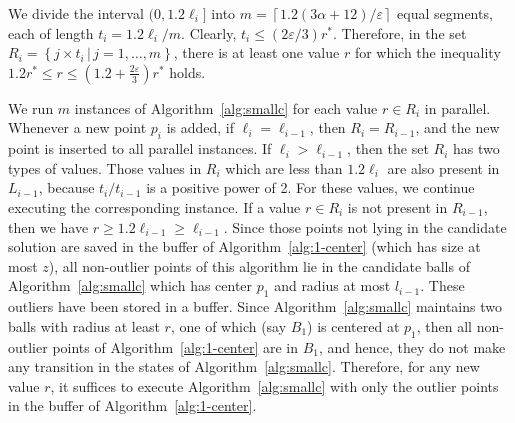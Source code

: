 \documentclass[envcountsame]{cls/cccg15}
\renewcommand{\O}{\ensuremath{{O}}}
\newcommand{\set}[1]{\left\{ #1 \right\}}
\newcommand{\ceil}[1]{\left\lceil{#1}\right\rceil}
\newcommand{\provided}{\,|\,}
\newcommand{\lee}{\leqslant}
\newcommand{\gee}{\geqslant}
\renewcommand{\le}{\lee}
\renewcommand{\ge}{\gee}
\newcommand{\eps}{\varepsilon}
\begin{document}
We divide the interval $(0, 1.2 \ell_i]$ 
into $m=\ceil{{1.2 (3 \alpha+12)}/{\eps}}$ equal segments,
each of length $t_i = 1.2 \ell_i / m$.
Clearly,  $t_i \le (2\eps/3) r^*$.
Therefore, in the set
$R_i = \set{j \times t_i \provided j = 1, \dots, m}$,
there is at least one value $r$ for which the  
inequality $1.2 r^* \le r \le (1.2 + \frac{2\eps}{3})r^*$ holds.


We run $m$ instances of Algorithm~\ref{alg:smallc} for each value $r \in R_i$ in parallel. 
Whenever a new point $p_i$ is added, 
if $\ell_i=\ell_{i-1}$, then $R_i = R_{i-1}$,
and the new point is inserted to all parallel instances. %
If $\ell_i > \ell_{i-1}$, then the set $R_i$ has two types of values.
Those values in $R_i$ which are less than $1.2\ell_i$ are also present in $L_{i-1}$,
because $t_i / t_{i-1}$ is a positive power of 2.
For these values, we continue executing the corresponding instance.
If a value $r \in R_i$ is not present in $R_{i-1}$, 
then we have $r \ge 1.2 \ell_{i - 1} \ge \ell_{i-1}$.
Since those points not lying in the candidate solution 
are saved in the buffer of Algorithm~\ref{alg:1-center} (which has size at most $z$), 
all non-outlier points of this algorithm lie in the candidate balls of Algorithm~\ref{alg:smallc} which has center $p_1$ and radius at most $l_{i-1}$. 
These outliers have been stored in a buffer. 
Since Algorithm~\ref{alg:smallc} maintains two balls with radius at least $r$, 
one of which (say $B_1$) is centered at $p_1$, 
then all non-outlier points of Algorithm~\ref{alg:1-center} are in $B_1$,
and hence, they do not make any transition in the states of Algorithm~\ref{alg:smallc}.
Therefore, for any new value $r$, 
it suffices to execute Algorithm~\ref{alg:smallc} with only the 
outlier points in the buffer of Algorithm~\ref{alg:1-center}.
\end{document}

